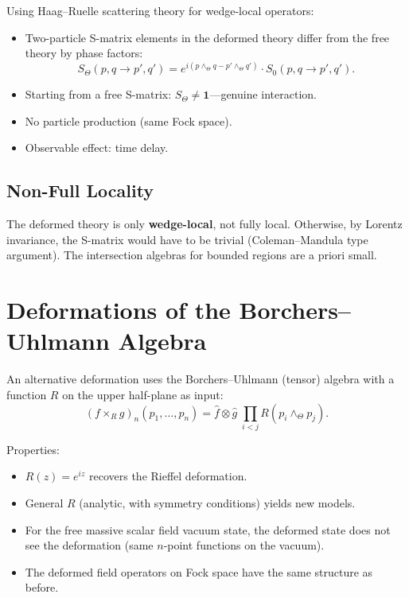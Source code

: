 \documentclass[11pt,a4paper]{article}
\begin{document}
Using Haag--Ruelle scattering theory for wedge-local operators:
\begin{itemize}[nosep]
  \item Two-particle S-matrix elements in the deformed theory differ from
        the free theory by phase factors:
        \begin{equation}
          S_\Theta(p, q \to p', q') = e^{i(p \wedge_\Theta q - p' \wedge_\Theta q')}
          \cdot S_0(p, q \to p', q').
        \end{equation}
  \item Starting from a free S-matrix: $S_\Theta \neq \mathbf{1}$---genuine
        interaction.
  \item No particle production (same Fock space).
  \item Observable effect: time delay.
\end{itemize}

\subsection{Non-Full Locality}

The deformed theory is only \textbf{wedge-local}, not fully local.
Otherwise, by Lorentz invariance, the S-matrix would have to be trivial
(Coleman--Mandula type argument). The intersection algebras for bounded
regions are a priori small.

\section{Deformations of the Borchers--Uhlmann Algebra}

An alternative deformation uses the Borchers--Uhlmann (tensor) algebra
with a function $R$ on the upper half-plane as input:
\begin{equation}
  (f \times_R g)_n(p_1,\ldots,p_n) = \hat{f} \otimes \hat{g}\;
  \prod_{i<j} R(p_i \wedge_\Theta p_j).
\end{equation}

Properties:
\begin{itemize}[nosep]
  \item $R(z) = e^{iz}$ recovers the Rieffel deformation.
  \item General $R$ (analytic, with symmetry conditions) yields new models.
  \item For the free massive scalar field vacuum state, the deformed state
        does not see the deformation (same $n$-point functions on the vacuum).
  \item The deformed field operators on Fock space have the same structure
        as before.
\end{itemize}
\end{document}
